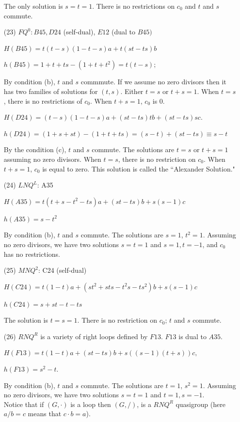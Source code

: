 \documentclass[11pt]{amsart}
\theoremstyle{definition}
\begin{document}
\begin{enumerate}
     The only solution is $s=t=1$. There is no restrictions on $c_0$ and  $t$ and $s$  commute.
    
    \item[(23)] $FQ^0: B45, D24$ (self-dual), $E12$ (dual to $B45)$ 

    $H(B45)= t(t-s)(1-t-s)a + t(st-ts)b$
     
     $h(B45)= 1+t+ts -(1+t+t^2)= t(t-s);$
    
    By condition (b), $t$ and $s$ commmute.
     If we assume no zero divisors then it has two families of solutions for $(t,s)$. Either $t=s$ or $t+s=1$. When $t=s$, there is no restrictions of $c_0$. When $t+s=1$, $c_0$ is 0. 
   

    
    
    $H(D24)= (t-s)(1-t-s)a + (st-ts)tb + (st-ts)sc.$

    $h(D24)=(1+s+st)-(1+t+ts)=(s-t)+ (st-ts)\equiv s-t$

By the condition (c), $t$ and $s$ commute.
   The solutions are $t=s$ or $t+s=1$ assuming no zero divisors. When $t=s$, there is no restriction on $c_0$. When $t+s=1$, $c_0$ is equal to zero. This solution is called the ``Alexander Solution."

     

    \item[(24)] $LNQ^L$: A35 

    $H(A35) = t(t+s-t^2-ts)a+(st-ts)b+s(s-1)c$

    $h(A35) = s-t^2$

    By condition (b), $t$ and $s$ commute. The solutions are $s=1$, $t^2=1$. Assuming no zero divisors, we have two solutions $s=t=1$ and $s=1, t=-1$, and $c_0$ has no restrictions.
     


    
    \item[(25)] $MNQ^2$: C24 (self-dual)
    
    $H(C24) = t(1-t)a+(st^2+sts -t^2s-ts^2)b+s(s-1)c$

$h(C24) = s+st-t-ts$

    The solution is $t=s=1$. There is no restriction on $c_0$; $t$ and $s$ commute.
    

    
   
    \item[(26)] $RNQ^R$ is a variety of right loops defined by $F13$. $F13$ is dual to $A35$. 
    
    $H(F13) = t(1-t)a +(st-ts)b+s((s-1)(t+s))c,$
    
    $h(F13)=s^2-t.$

    By condition (b), $t$ and $s$ commute. The solutions are $t=1$, $s^2=1$. Assuming no zero divisors, we have two solutions $s=t=1$ and $t=1, s = -1$.
    \\ Notice that if $(G,\cdot)$ is a loop then $(G,/ )$, is a $RNQ^R$ quasigroup (here $a/b=c$ means that $c\cdot b=a$).

\end{enumerate}
\end{document}
